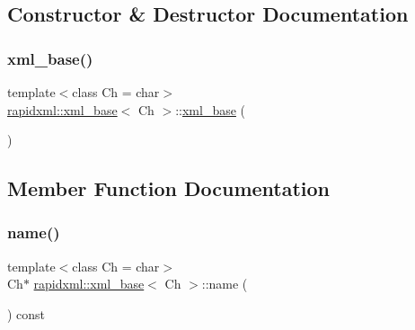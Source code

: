 \subsection{Constructor \& Destructor Documentation}
\mbox{\label{classrapidxml_1_1xml__base_a23e7f7aac02d17a0a01afb597e4b966b}} 
\subsubsection{\texorpdfstring{xml\_base()}{xml\_base()}}
{\footnotesize\ttfamily template$<$class Ch  = char$>$ \\
\mbox{\hyperlink{classrapidxml_1_1xml__base}{rapidxml\+::xml\+\_\+base}}$<$ Ch $>$\+::\mbox{\hyperlink{classrapidxml_1_1xml__base}{xml\+\_\+base}} (\begin{DoxyParamCaption}{ }\end{DoxyParamCaption})\hspace{0.3cm}{\ttfamily [inline]}}



\subsection{Member Function Documentation}
\mbox{\label{classrapidxml_1_1xml__base_aef8ae147fbee59209f714274afc80dc4}} 
\subsubsection{\texorpdfstring{name()}{name()}\hspace{0.1cm}{\footnotesize\ttfamily [1/3]}}
{\footnotesize\ttfamily template$<$class Ch  = char$>$ \\
Ch$\ast$ \mbox{\hyperlink{classrapidxml_1_1xml__base}{rapidxml\+::xml\+\_\+base}}$<$ Ch $>$\+::name (\begin{DoxyParamCaption}{ }\end{DoxyParamCaption}) const\hspace{0.3cm}{\ttfamily [inline]}}

